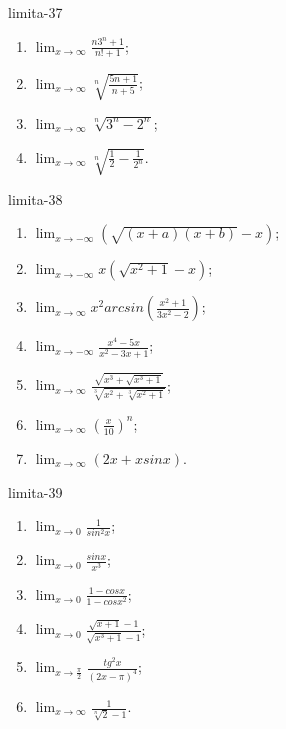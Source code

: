 \begin{defproblem}{limita-37}
\begin{multicols}{2}
\begin{enumerate}
    \item $\lim_{{x \rightarrow \infty}} \frac{n 3^n+1}{n!+1}$;
    \item $\lim_{{x \rightarrow \infty}} \sqrt[n]{\frac{5n+1}{n+5}}$;
    \item $\lim_{{x \rightarrow \infty}} \sqrt[n]{3^n-2^n}$;
    \item $\lim_{{x \rightarrow \infty}} \sqrt[n]{\frac{1}{2}-\frac{1}{2^n}}$.
\end{enumerate}
\end{multicols}
\end{defproblem}

\begin{defproblem}{limita-38}
\begin{multicols}{2}
\begin{enumerate}
    \item $\lim_{{x \rightarrow -\infty}} (\sqrt{(x+a)(x+b)}-x)$;
    \item $\lim_{{x \rightarrow -\infty}} x(\sqrt{x^2+1}-x)$;
    \item $\lim_{{x \rightarrow \infty}} x^2arcsin(\frac{x^2+1}{3x^2-2})$;
    \item $\lim_{{x \rightarrow -\infty}} \frac{x^4-5x}{x^2-3x+1}$;
    \item $\lim_{{x \rightarrow \infty}} \frac{\sqrt{x^3+\sqrt{x^3+1}}}{\sqrt[3]{x^2+\sqrt[3]{x^2+1}}}$;
    \item $\lim_{{x \rightarrow \infty}} (\frac{x}{10})^n$;
    \item $\lim_{{x \rightarrow \infty}} (2x+x sin x)$.
\end{enumerate}
\end{multicols}
\end{defproblem}

\begin{defproblem}{limita-39}
\begin{multicols}{2}
\begin{enumerate}
    \item $\lim_{{x \rightarrow 0}} \frac{1}{sin ^2 x}$;
    \item $\lim_{{x \rightarrow 0}} \frac{sin x}{x^3}$;
    \item $\lim_{{x \rightarrow 0}} \frac{1-cos x}{1-cos x^2}$;
    \item $\lim_{{x \rightarrow 0}} \frac{\sqrt{x+1}-1}{\sqrt{x^3+1}-1}$;
    \item $\lim_{{x \rightarrow \frac{\pi}{2}}} \frac{tg ^2 x}{(2x-\pi)^4}$;
    \item $\lim_{{x \rightarrow \infty}} \frac{1}{\sqrt[n]{2}-1}$.
\end{enumerate}
\end{multicols}
\end{defproblem}

